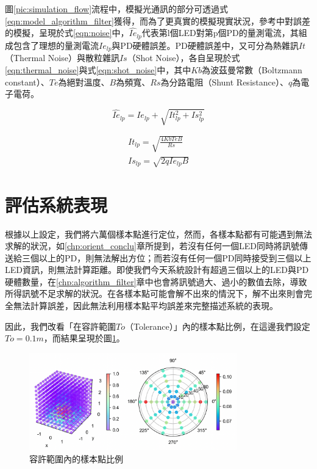 圖\ref{pic:simulation_flow}流程中，模擬光通訊的部分可透過式\ref{eqn:model_algorithm_filter}獲得，而為了更真實的模擬現實狀況，參考\cite{survey_light2018}中對誤差的模擬，呈現於式\ref{eqn:noise}中，$\hat{Ie}_{lp}$代表第l個LED對第p個PD的量測電流，其組成包含了理想的量測電流$Ie_{lp}$與PD硬體誤差。PD硬體誤差中，又可分為熱雜訊$It$（Thermal Noise）與散粒雜訊$Is$（Shot Noise），各自呈現於式\ref{eqn:thermal_noise}與式\ref{eqn:shot_noise}中，其中$Kb$為波茲曼常數（Boltzmann constant）、$Te$為絕對溫度、$B$為頻寬、$Rs$為分路電阻（Shunt Resistance）、$q$為電子電荷。

\begin{equation}
\label{eqn:noise}
    \hat{Ie}_{lp}=Ie_{lp}+\sqrt{It_{lp}^2+Is_{lp}^2} 
\end{equation}


\begin{gather}
    \label{eqn:thermal_noise}
    It_{lp}=\sqrt{\frac{4 Kb Te B}{Rs}}\\
    \label{eqn:shot_noise}
    Is_{lp}=\sqrt{2qIe_{lp}B}
\end{gather}




\section{評估系統表現}
\label{chp:system_perform}



根據以上設定，我們將六萬個樣本點進行定位，然而，各樣本點都有可能遇到無法求解的狀況，如\ref{chp:orient_conclu}章所提到，若沒有任何一個LED同時將訊號傳送給三個以上的PD，則無法解出方位；而若沒有任何一個PD同時接受到三個以上LED資訊，則無法計算距離。即使我們今天系統設計有超過三個以上的LED與PD硬體數量，在\ref{chp:algorithm_filter}章中也會將訊號過大、過小的數值去除，導致所得訊號不足求解的狀況。在各樣本點可能會解不出來的情況下，解不出來則會完全無法計算誤差，因此無法利用樣本點平均誤差來完整描述系統的表現。

因此，我們改看「在容許範圍$To$（Tolerance）」內的樣本點比例，在這邊我們設定$To=0.1m$，而結果呈現於圖\ref{pic:sample_out}。

\begin{figure}[ht]
    \centering
    \includegraphics[width=9cm]{ch4pic/sample_out.png}
    \caption{容許範圍內的樣本點比例}
    \label{pic:sample_out}
\end{figure}

